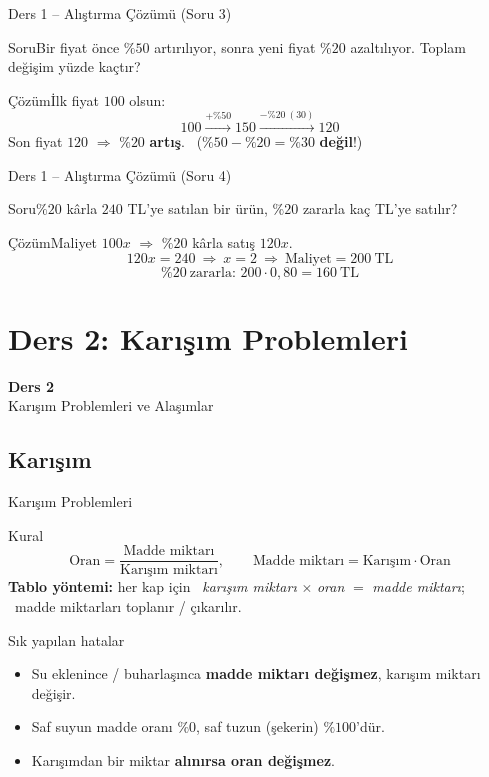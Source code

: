 \documentclass[aspectratio=169,11pt,handout]{beamer}
\newcommand{\soru}[3]{%
\begin{frame}{#1}
  \begin{block}{Soru}\large #2\end{block}
  \pause
  \begin{exampleblock}{Çözüm}\large #3\end{exampleblock}
\end{frame}}
\begin{document}
\soru{Ders 1 -- Alıştırma Çözümü (Soru 3)}
{Bir fiyat önce \(\%50\) artırılıyor, sonra yeni fiyat \(\%20\) azaltılıyor. Toplam değişim yüzde kaçtır?}
{İlk fiyat \(100\) olsun:
\[100\xrightarrow{+\%50}150\xrightarrow{-\%20\ (30)}120\]
Son fiyat \(120\) \(\Rightarrow\) \(\%20\) \textbf{artış}. \ (\(\%50-\%20=\%30\) \textbf{değil}!)}

\soru{Ders 1 -- Alıştırma Çözümü (Soru 4)}
{\(\%20\) kârla \(240\) TL'ye satılan bir ürün, \(\%20\) zararla kaç TL'ye satılır?}
{Maliyet \(100x\) \(\Rightarrow\) \(\%20\) kârla satış \(120x\).
\[120x=240\ \Rightarrow\ x=2\ \Rightarrow\ \text{Maliyet}=200\ \text{TL}\]
\[\%20\ \text{zararla: } 200\cdot 0{,}80=160\ \text{TL}\]}

\section{Ders 2: Karışım Problemleri}
\begin{frame}
\centering\Large\color{anamavi}\textbf{Ders 2}\\[6pt]\normalsize Karışım Problemleri ve Alaşımlar
\end{frame}

\subsection{Karışım}
\begin{frame}{Karışım Problemleri}
\begin{block}{Kural}
\[\text{Oran}=\frac{\text{Madde miktarı}}{\text{Karışım miktarı}},\qquad \text{Madde miktarı}=\text{Karışım}\cdot\text{Oran}\]
\textbf{Tablo yöntemi:} her kap için \ \textit{karışım miktarı} \(\times\) \textit{oran} \(=\) \textit{madde miktarı}; \ madde miktarları toplanır / çıkarılır.
\end{block}
\begin{alertblock}{Sık yapılan hatalar}
\begin{itemize}
\item Su eklenince / buharlaşınca \textbf{madde miktarı değişmez}, karışım miktarı değişir.
\item Saf suyun madde oranı \(\%0\), saf tuzun (şekerin) \(\%100\)'dür.
\item Karışımdan bir miktar \textbf{alınırsa oran değişmez}.
\end{itemize}
\end{alertblock}
\end{frame}
\end{document}
